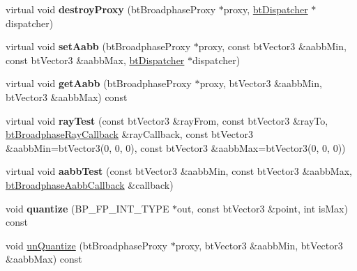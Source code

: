 \begin{DoxyCompactItemize}
\item 
\mbox{\label{classbtAxisSweep3Internal_ad994787298649e89fc55a6d43af65a1e}} 
virtual void {\bfseries destroy\+Proxy} (bt\+Broadphase\+Proxy $\ast$proxy, \hyperlink{classbtDispatcher}{bt\+Dispatcher} $\ast$dispatcher)
\item 
\mbox{\label{classbtAxisSweep3Internal_ab75a4fc28e56239fe76c061f6ee9231c}} 
virtual void {\bfseries set\+Aabb} (bt\+Broadphase\+Proxy $\ast$proxy, const bt\+Vector3 \&aabb\+Min, const bt\+Vector3 \&aabb\+Max, \hyperlink{classbtDispatcher}{bt\+Dispatcher} $\ast$dispatcher)
\item 
\mbox{\label{classbtAxisSweep3Internal_a026daa514a4f37ecab5e49266c1203b2}} 
virtual void {\bfseries get\+Aabb} (bt\+Broadphase\+Proxy $\ast$proxy, bt\+Vector3 \&aabb\+Min, bt\+Vector3 \&aabb\+Max) const
\item 
\mbox{\label{classbtAxisSweep3Internal_a370bc732655b33bf166114afe22fb9e7}} 
virtual void {\bfseries ray\+Test} (const bt\+Vector3 \&ray\+From, const bt\+Vector3 \&ray\+To, \hyperlink{structbtBroadphaseRayCallback}{bt\+Broadphase\+Ray\+Callback} \&ray\+Callback, const bt\+Vector3 \&aabb\+Min=bt\+Vector3(0, 0, 0), const bt\+Vector3 \&aabb\+Max=bt\+Vector3(0, 0, 0))
\item 
\mbox{\label{classbtAxisSweep3Internal_ac93d0e99a1f936209fae09406663b9b6}} 
virtual void {\bfseries aabb\+Test} (const bt\+Vector3 \&aabb\+Min, const bt\+Vector3 \&aabb\+Max, \hyperlink{structbtBroadphaseAabbCallback}{bt\+Broadphase\+Aabb\+Callback} \&callback)
\item 
\mbox{\label{classbtAxisSweep3Internal_a852908ebce2e0b632f18cae17860fc47}} 
void {\bfseries quantize} (B\+P\+\_\+\+F\+P\+\_\+\+I\+N\+T\+\_\+\+T\+Y\+PE $\ast$out, const bt\+Vector3 \&point, int is\+Max) const
\item 
\mbox{\label{classbtAxisSweep3Internal_a33d53264ea5d7f695e97200ca752fbe5}} 
void \hyperlink{classbtAxisSweep3Internal_a33d53264ea5d7f695e97200ca752fbe5}{un\+Quantize} (bt\+Broadphase\+Proxy $\ast$proxy, bt\+Vector3 \&aabb\+Min, bt\+Vector3 \&aabb\+Max) const

\end{DoxyCompactItemize}

